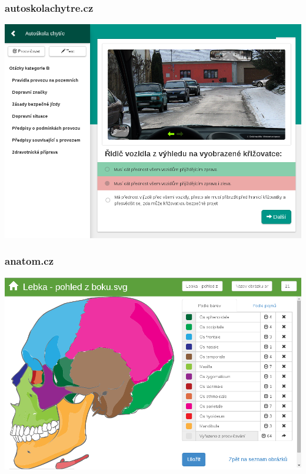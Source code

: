 \documentclass[xcolor=svgnames]{beamer}
\begin{document}
\begin{frame}
	\frametitle{autoskolachytre.cz}
	 
   \includegraphics[width=\textwidth]{img/autoskola.png}
\end{frame}
\begin{frame}
	\frametitle{anatom.cz}
	 
   \includegraphics[width=\textwidth]{img/anatomie.png}
\end{frame}
\end{document}
